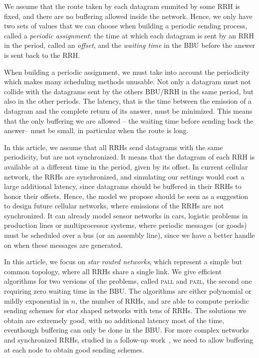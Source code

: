 \documentclass[a4paper,10pt]{article}
\newcommand\pazl{\textsc{pazl}\xspace}
\newcommand\pall{\textsc{pall}\xspace}
\begin{document}
We assume that the route taken by each datagram emmited by some RRH is fixed, and there are no buffering allowed inside the network. Hence, we only have two sets of values that we can choose when building a periodic sending process, called a \emph{periodic assignment}: the time at which each datagram is sent by an RRH in the period, called an \emph{offset}, and the \emph{waiting time} in the BBU before the answer is sent back to the RRH. 


When building a periodic assignment, we must take into account the periodicity which makes many scheduling methods unusable. Not only a datagram must not collide with the datagrams sent by the others BBU/RRH in the same period, but also in the other periods. The latency, that is the time between the emission of a datagram and the complete return of its answer, must be minimized. This means that the only buffering we are allowed -- the waiting time before sending back the answer-- must be small, in particular when the route is long.

 In this article, we assume that all RRHs send datagrams with the same periodicity, but are not synchronized. It means that the datagram of each RRH is available at a different time in the period, given by its offset.
 In current cellular network, the RRHs are synchronized, and simulating our settings would cost a large additional latency, since datagrams should be buffered in their RRHs to honor their offsets. 
Hence, the model we propose should be seen as a suggestion to design future cellular networks, where emissions of the RRHs are not synchronized. It can already model sensor networks in cars, logistic problems in production lines or multiprocessor systems, where periodic messages (or goods) must be scheduled over a bus (or an assembly line), since we have a better handle on when these messages are generated.
 
In this article, we focus on \emph{star routed networks}, which represent a simple but common topology,
where all RRHs share a single link. We give efficient algorithms for two versions of the problems, called 
\pall and \pazl, the second one requiring zero waiting time in the BBU. The algorithms are either polynomial or mildly exponential in $n$, the number of RRHs, and are able to compute periodic sending schemes
for star shaped networks with tens of RRHs. The solutions we obtain are extremely good, with no 
additional latency most of the time, eventhough buffering can only be done in the BBU. For more complex networks and synchronized RRHs, studied in a follow-up work~\cite{guiraud2020synchronized}, we need to allow buffering at each node to obtain good sending schemes.
\end{document}
